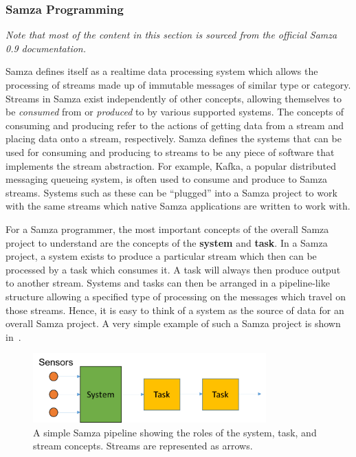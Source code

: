 \subsubsection{Samza Programming} %
\label{ssub:samza_programming}

\textit{Note that most of the content in this section is sourced from the official Samza 0.9 documentation.}~\cite{Samza:doc}

Samza defines itself as a realtime data processing system which allows the processing of streams made up of immutable
messages of similar type or category. Streams in Samza exist independently of other concepts, allowing themselves to be
\textit{consumed} from or \textit{produced} to by various supported systems. The concepts of consuming and producing refer
to the actions of getting data from a stream and placing data onto a stream, respectively. Samza defines the systems that can be used
for consuming and producing to streams to be any piece of software that implements the stream abstraction. For example,
Kafka, a popular distributed messaging queueing system, is often used to consume and produce to Samza streams. Systems such as these can be
``plugged'' into a Samza project to work with the same streams which native Samza applications are written to work with.

For a Samza programmer, the most important concepts of the overall Samza project to understand are the concepts of the
\textbf{system} and \textbf{task}. In a Samza project, a system exists to produce a particular stream which then can
be processed by a task which consumes it. A task will always then produce output to another stream. Systems and tasks
can then be arranged in a pipeline-like structure allowing a specified type of processing on the messages which travel
on those streams. Hence, it is easy to think of a system as the source of data for an overall Samza project. A very
simple example of such a Samza project is shown in~.

\begin{figure}[h]
  \centering
  \includegraphics[width=0.8\textwidth]{includes/figures/fig_samza_overview}
  \caption{A simple Samza pipeline showing the roles of the system, task, and stream concepts. Streams are represented
  as arrows.}
  \label{fig:samza_overview}
\end{figure}

